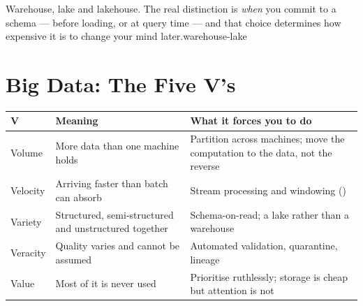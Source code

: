 {}%
{Warehouse, lake and lakehouse. The real distinction is \emph{when} you commit to a
schema --- before loading, or at query time --- and that choice determines how expensive
it is to change your mind later.}{warehouse-lake}

\section{Big Data: The Five V's}

\begin{longtable}{@{}L{2.3cm}L{4.3cm}L{7.4cm}@{}}
\toprule
{}
\textbf{V} & \textbf{Meaning} & \textbf{What it forces you to do} \\
\midrule
\endhead
Volume & More data than one machine holds & Partition across machines; move the computation to the data, not the reverse \\
Velocity & Arriving faster than batch can absorb & Stream processing and windowing () \\
Variety & Structured, semi-structured and unstructured together & Schema-on-read; a lake rather than a warehouse \\
Veracity & Quality varies and cannot be assumed & Automated validation, quarantine, lineage \\
Value & Most of it is never used & Prioritise ruthlessly; storage is cheap but attention is not \\
\bottomrule
\end{longtable}

